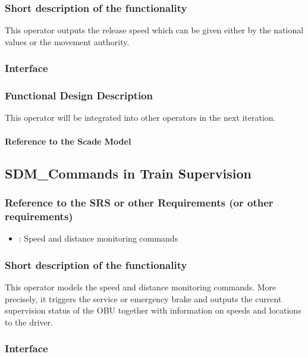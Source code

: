 \subsubsection{Short description of the functionality}
This operator outputs the release speed which can be given either by the national values or the movement authority.

\subsubsection{Interface}

\subsubsection{Functional Design Description}
This operator will be integrated into other operators in the next iteration.

\paragraph{Reference to the Scade Model}


\subsection{SDM\_Commands in Train Supervision}

\subsubsection{Reference to the SRS or other Requirements (or other requirements)}
\begin{itemize}
	\item \cite[Chapt.~3.13.10]{subset-026}: Speed and distance monitoring commands 
\end{itemize}

\subsubsection{Short description of the functionality}
This operator models the speed and distance monitoring commands. More precisely, it triggers the service or emergency brake and outputs the current supervision status of the OBU together with information on speeds and locations to the driver.

\subsubsection{Interface}

